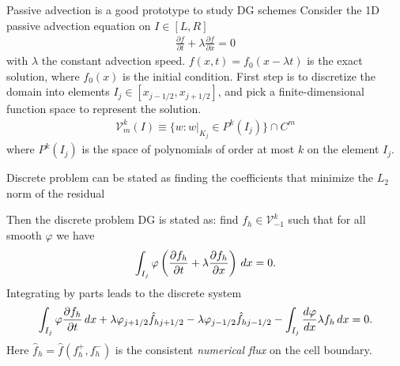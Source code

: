 \documentclass[pdf]{beamer}
\newcommand{\pfrac}[2]{\frac{\partial #1}{\partial #2}}
\theoremstyle{definition}
\begin{document}
\begin{frame}{Passive advection is a good prototype to study DG
    schemes}
  Consider the 1D passive advection equation on $I\in [L,R]$
  \begin{align*}
    \pfrac{f}{t} + \lambda \pfrac{f}{x} = 0
  \end{align*}
  with $\lambda$ the constant advection speed. $f(x,t) = f_0(x-\lambda
  t)$ is the exact solution, where $f_0(x)$ is the initial condition.
  First step is to discretize the domain into elements $I_j\in
  [x_{j-1/2},x_{j+1/2}]$, and pick a finite-dimensional function space
  to represent the solution.
  \begin{align*}
    \mathcal{V}^k_m(I) \equiv \{w: w|_{K_j} \in P^k(I_j) \} \cap C^m
  \end{align*}
  where $P^k(I_j)$ is the space of polynomials of order at most $k$
  on the element $I_j$.
\end{frame}

\begin{frame}{Discrete problem can be stated as finding the
    coefficients that minimize the $L_2$ norm of the residual}

  Then the discrete problem DG is stated as: find $f_h\in
  \mathcal{V}^k_{-1}$ such that for all smooth $\varphi$ we have
  \begin{align*}
    \int_{I_j} \varphi\left(
      \pfrac{f_h}{t} 
      + \lambda \pfrac{f_h}{x}
      \right)
    \thinspace dx = 0.
  \end{align*}
  Integrating by parts leads to the discrete system
  \begin{align*}
    \int_{I_j} \varphi \pfrac{f_h}{t}\thinspace dx
    +
    \lambda \varphi_{j+1/2}\hat{f}_{hj+1/2} - \lambda \varphi_{j-1/2}\hat{f}_{hj-1/2}
    -
    \int_{I_j}  \frac{d\varphi}{dx}\lambda f_h\thinspace dx = 0.
  \end{align*}
  Here $\hat{f}_{h} = \hat{f}(f^+_h,f^-_h)$ is the consistent
  \emph{numerical flux} on the cell boundary.
  
\end{frame}
\end{document}
